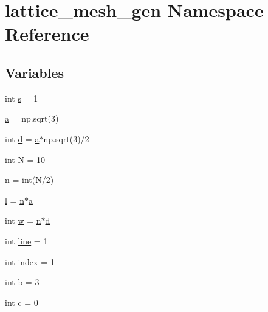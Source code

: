 \hypertarget{namespacelattice__mesh__gen}{}\section{lattice\+\_\+mesh\+\_\+gen Namespace Reference}
\label{namespacelattice__mesh__gen}
\subsection*{Variables}
\begin{DoxyCompactItemize}
\item 
int \mbox{\hyperlink{namespacelattice__mesh__gen_aa252aa6577d76f8f6c44d2668efd44a7}{s}} = 1
\item 
\mbox{\hyperlink{namespacelattice__mesh__gen_a9b408c7e0116513bd91341c7c1825e62}{a}} = np.\+sqrt(3)
\item 
int \mbox{\hyperlink{namespacelattice__mesh__gen_ad788f27e541fc28a0629818c108870a6}{d}} = \mbox{\hyperlink{namespacelattice__mesh__gen_a9b408c7e0116513bd91341c7c1825e62}{a}}$\ast$np.\+sqrt(3)/2
\item 
int \mbox{\hyperlink{namespacelattice__mesh__gen_a06e6d250f7d6f463d8e22a6d6314d349}{N}} = 10
\item 
\mbox{\hyperlink{namespacelattice__mesh__gen_ae3c1557409cb7f6416beac54d47c76b2}{n}} = int(\mbox{\hyperlink{namespacelattice__mesh__gen_a06e6d250f7d6f463d8e22a6d6314d349}{N}}/2)
\item 
\mbox{\hyperlink{namespacelattice__mesh__gen_a58cedc5fe78cbd7d5824c3ad2e0d6ace}{l}} = \mbox{\hyperlink{namespacelattice__mesh__gen_ae3c1557409cb7f6416beac54d47c76b2}{n}}$\ast$\mbox{\hyperlink{namespacelattice__mesh__gen_a9b408c7e0116513bd91341c7c1825e62}{a}}
\item 
int \mbox{\hyperlink{namespacelattice__mesh__gen_a00fc2c2924f739450fce94257019b98a}{w}} = \mbox{\hyperlink{namespacelattice__mesh__gen_ae3c1557409cb7f6416beac54d47c76b2}{n}}$\ast$\mbox{\hyperlink{namespacelattice__mesh__gen_ad788f27e541fc28a0629818c108870a6}{d}}
\item 
int \mbox{\hyperlink{namespacelattice__mesh__gen_a99f0e79523670fd8c474a01f108a2fce}{line}} = 1
\item 
int \mbox{\hyperlink{namespacelattice__mesh__gen_a28ff752f9197a3e85057e035219f7bde}{index}} = 1
\item 
int \mbox{\hyperlink{namespacelattice__mesh__gen_a54ab8cc81e712015f8b518e9eccbd869}{b}} = 3
\item 
int \mbox{\hyperlink{namespacelattice__mesh__gen_ad61dbb6975bff986897162d39a34d760}{c}} = 0
\end{DoxyCompactItemize}


